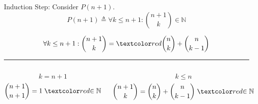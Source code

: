 \begin{frame}{}
  \begin{center}
    Induction Step: Consider $P(n+1)$.
    \[
      P(n+1) \triangleq \forall k \le n+1: {n+1 \choose k} \in \mathbb{N}
    \]

    \pause
    \[
      \forall k \le n+1: {n+1 \choose k} = \red{{n \choose k}} + {n \choose k-1}
    \]

    \pause
    \hrule
    \begin{columns}
	\begin{center}
	  \[
	    k = n+1
	  \]
	  \[
	    {n+1 \choose n+1} = 1\; \red{\in \mathbb{N}}
	  \]
	\end{center}
        \pause
	\begin{center}
	  \[
	    k \le n
	  \]
	  \[
	    {n+1 \choose k} = {n \choose k} + {n \choose k-1}\; \red{\in \mathbb{N}}
	  \]
	\end{center}
    \end{columns}
  \end{center}
\end{frame}

\begin{frame}

\end{frame}
